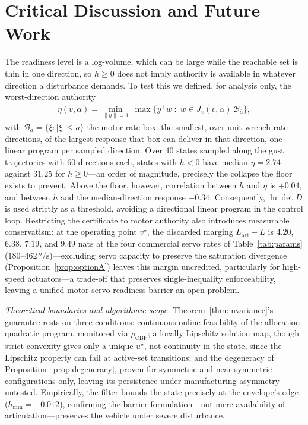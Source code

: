 \documentclass[letter, 10 pt, journal, twoside]{IEEEtran}
\theoremstyle{compact}
\begin{document}
\section{Critical Discussion and Future Work}\label{sec:disc}

The readiness level is a log-volume, which can be large while the reachable set is thin in one direction, so $h\ge0$ does not imply authority is available in whatever direction a disturbance demands. To test this we defined, for analysis only, the worst-direction authority
%
\begin{align}
    \eta(v,\alpha) = \min_{\|y\|=1}\ \max\big\{y^{\!\top}\dot w \;:\;
    \dot w \in J_v(v,\alpha)\,\mathcal{B}_{\bar a}\big\},
    \label{eq:eta}
\end{align}
%
with $\mathcal{B}_{\bar a}=\{\xi: |\xi|\le\bar a\}$ the motor-rate box: the smallest, over unit wrench-rate directions, of the largest response that box can deliver in that direction, one linear program per sampled direction. Over $40$ states sampled along the gust trajectories with $60$ directions each, states with $h<0$ have median $\eta=2.74$ against $31.25$ for $h\ge0$---an order of magnitude, precisely the collapse the floor exists to prevent. Above the floor, however, correlation between $h$ and $\eta$ is $+0.04$, and between $h$ and the median-direction response $-0.34$.  Consequently, $\ln\det D$ is used strictly as a threshold, avoiding a directional linear program in the control loop. Restricting the certificate to motor authority also introduces measurable conservatism: at the operating point $v^\star$, the discarded marging $L_\mathrm{art}-L$ is $4.20$, $6.38$, $7.19$, and $9.49$ nats at the four commercial servo rates of Table~\ref{tab:params} ($180$--$\SI{462}{\degree\per\second}$)---excluding servo capacity to preserve the saturation divergence (Proposition~\ref{prop:optionA}) leaves this margin uncredited, particularly for high-speed actuators---a trade-off that preserves single-inequality enforceability, leaving a unified motor-servo readiness barrier an open problem.

\emph{Theoretical boundaries and algorithmic scope.}
Theorem~\ref{thm:invariance}'s guarantee rests on three conditions: continuous online feasibility of the allocation quadratic program, monitored via $\rho_{\mathrm{CBF}}$; a locally Lipschitz solution map, though strict convexity gives only a unique $u^\star$, not continuity in the state, since the Lipschitz property can fail at active-set transitions; and the degeneracy of Proposition~\ref{prop:degeneracy}, proven for symmetric and near-symmetric configurations only, leaving its persistence under manufacturing asymmetry untested. Empirically, the filter bounds the state precisely at the envelope's edge ($h_{\min}=+0.012$), confirming the barrier formulation---not mere availability of articulation---preserves the vehicle under severe disturbance.
\end{document}
